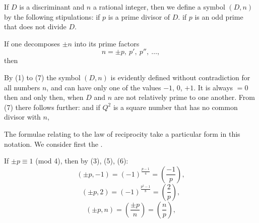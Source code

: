 
If $D$ is a discriminant and $n$ a rational integer, then we define a symbol $(D,n)$ by the following stipulations:
if $p$ is a prime divisor of $D$.
if $p$ is an odd prime that does not divide $D$.

If one decomposes $\pm n$ into its prime factors
\[
n = \pm p,\ p',\ p'',\ \dots,
\]
then

By (1) to (7) the symbol $(D,n)$ is evidently defined without contradiction for all numbers $n$, and can have only one of the values $-1$, $0$, $+1$. It is always $=0$ then and only then, when $D$ and $n$ are not relatively prime to one another. From (7) there follows further:
and if $Q^2$ is a square number that has no common divisor with $n$,

The formulae relating to the law of reciprocity take a particular form in this notation. We consider first the .

If $\pm p \equiv 1$ (mod 4), then by (3), (5), (6):
\[
(\pm p, -1) = (-1)^{\frac{p-1}{4}} = \left(\dfrac{-1}{p}\right),
\]
\[
(\pm p, 2) = (-1)^{\frac{p^2-1}{8}} = \left(\dfrac{2}{p}\right),
\]
\[
(\pm p, n) = \left(\dfrac{\pm p}{n}\right) = \left(\dfrac{n}{p}\right),
\]
